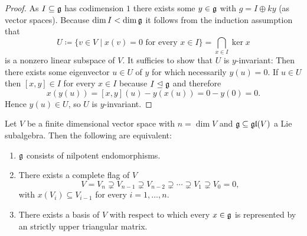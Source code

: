 \begin{proof}
 As $I \subseteq \mathfrak{g}$ has codimension $1$ there exists some $y \in \mathfrak{g}$ with $g = I \oplus ky$ (as vector spaces). Because $\dim I < \dim \mathfrak{g}$ it follows from the induction assumption that
 \[
  U \coloneqq \{v \in V \mid \text{$x(v) = 0$ for every $x \in I$}\} = \bigcap_{x \in I} \ker x
 \]
 is a nonzero linear subspace of $V$. It sufficies to show that $U$ is $y$-invariant: Then there exists some eigenvector $u \in U$ of $y$ for which necessarily $y(u) = 0$. If $u\in U$ then $[x,y] \in I$ for every $x \in I$ because $I \trianglelefteq \mathfrak{g}$ and therefore
 \[
  x(y(u)) = [x,y](u) - y(x(u)) = 0 - y(0) = 0.
 \]
 Hence $y(u) \in U$, so $U$ is $y$-invariant.
\end{proof}


\begin{prop}\label{prop: stuff for Engels theorem}
 Let $V$ be a finite dimensional vector space with $n = \dim V$ and $\mathfrak{g} \subseteq \mathfrak{gl}(V)$ a Lie subalgebra. Then the following are equivalent:
 \begin{enumerate}
  \item\label{enum: engels g consists of nilpotent endomorphisms}
   $\mathfrak{g}$ consists of nilpotent endomorphisms.
  \item\label{enum: engels there exists a complete flag shifted by g}
   There exists a complete flag of $V$
   \[
    V = V_n \supsetneq V_{n-1} \supsetneq V_{n-2} \supsetneq \dotsb \supsetneq V_1 \supsetneq V_0 = 0,
   \]
   with $x(V_i) \subseteq V_{i-1}$ for every $i = 1, \dotsc, n$.
  \item\label{enum: engels represented by strictly upper triangular matrices}
   There exists a basis of $V$ with respect to which every $x \in \mathfrak{g}$ is represented by an strictly upper triangular matrix.
 \end{enumerate}
\end{prop}
